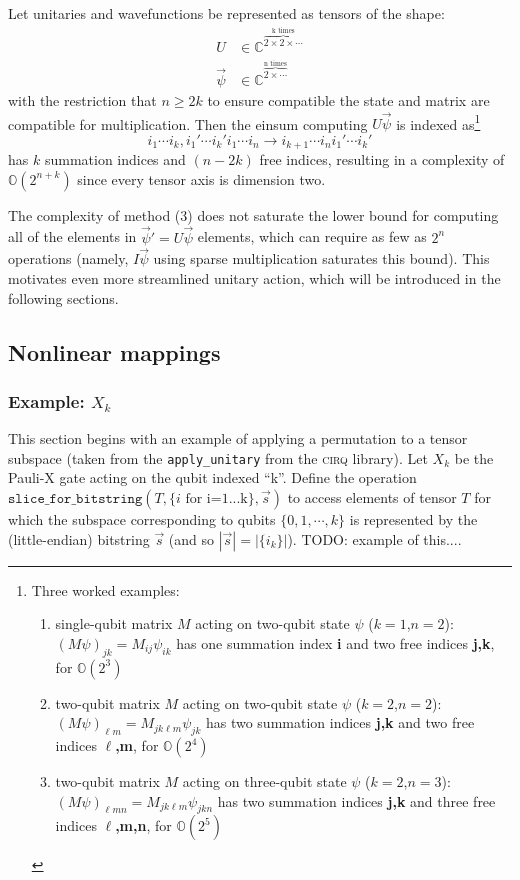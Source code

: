 \documentclass{article}
\begin{document}
\begin{enumerate}
		Let unitaries and wavefunctions be represented as tensors of the shape:
		\begin{align}
			U &\in \mathbb{C}^{\overbrace{ \scriptstyle 2 \times 2 \times \cdots}^{\text{k times}}} \\
			\vec{\psi} &\in \mathbb{C}^{\overbrace{ \scriptstyle 2 \times \cdots}^\text{n times}}
		\end{align}
		with the restriction that $n \geq 2k$ to ensure compatible the state and matrix are compatible for multiplication. Then the einsum computing $U\vec{\psi}$ is indexed as\footnote{Three worked examples:
			\begin{enumerate}
				\item single-qubit matrix $M$ acting on two-qubit state $\psi$ ($k=1$,$n=2$): $(M\psi)_{jk} = M_{ij} \psi_{ik}$ has one summation index \textbf{i} and two free indices \textbf{j,k}, for $\mathbb{O}(2^{3})$
				\item two-qubit matrix $M$ acting on two-qubit state $\psi$ ($k=2$,$n=2$): $(M\psi)_{\ell m} = M_{jk\ell m} \psi_{jk}$ has two summation indices \textbf{j,k} and two free indices \textbf{$\ell$,m}, for $\mathbb{O}(2^{4})$
				\item two-qubit matrix $M$ acting on three-qubit state $\psi$ ($k=2$,$n=3$): $(M\psi)_{\ell m n} = M_{jk\ell m} \psi_{jk n}$ has two summation indices \textbf{j,k} and three free indices \textbf{$\ell$,m,n}, for $\mathbb{O}(2^{5})$
			\end{enumerate}		}
		$$i_1 \cdots i_{k}, i_1' \cdots i_{k}' i_1 \cdots i_n \rightarrow  i_{k + 1} \cdots i_n i_1' \cdots i_k ' $$ has $k$ summation indices and $(n-2k)$ free indices, resulting in a complexity of $\mathbb{O}(2^{n + k})$ since every tensor axis is dimension two. 
\end{enumerate}

The complexity of method (3) does not saturate the lower bound for computing all of the elements in $\vec{\psi}' = U \vec{\psi}$ elements, which can require as few as $2^{n}$ operations (namely, $I \vec{\psi}$ using sparse multiplication saturates this bound). This motivates even more streamlined unitary action, which will be introduced in the following sections.

\subsection{Nonlinear mappings}

\subsubsection{Example: $X_k$}
\label{sec:clifford_example}
This section begins with an example of applying a permutation to a tensor subspace (taken from the \texttt{apply\_unitary} from the \textsc{cirq} library). Let $X_k$ be the Pauli-X gate acting on the qubit indexed ``k''. Define the operation $\texttt{slice\_for\_bitstring}(T, \{i\text{ for i=1...k}\}, \vec{s})$ to access elements of tensor $T$ for which the subspace corresponding to qubits $\{0, 1, \cdots, k\}$ is represented by the (little-endian) bitstring $\vec{s}$ (and so $|\vec{s}| = |\{i_k\}|$). TODO: example of this....
\end{document}
